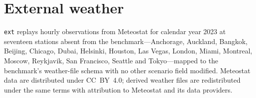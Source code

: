 \documentclass{article}
\newcommand{\cn}[1]{\texttt{#1}}
\begin{document}
\section{External weather}
\label{app:weather}

\cn{ext} replays hourly observations from Meteostat \citep{meteostat2024} for calendar
year 2023 at seventeen stations absent from the benchmark---Anchorage, Auckland,
Bangkok, Beijing, Chicago, Dubai, Helsinki, Houston, Las Vegas, London, Miami, Montreal,
Moscow, Reykjavik, San Francisco, Seattle and Tokyo---mapped to the benchmark's
weather-file schema with no other scenario field modified. Meteostat data are
distributed under CC~BY~4.0; derived weather files are redistributed under the same
terms with attribution to Meteostat and its data providers.
\end{document}
